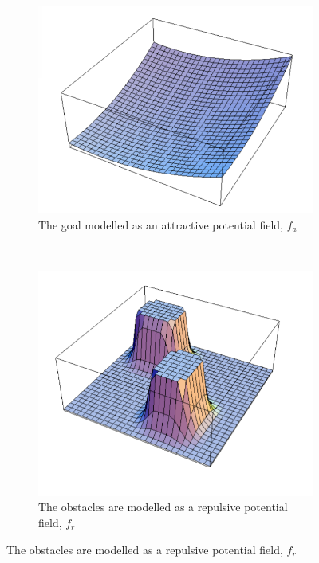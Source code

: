 \begin{figure}
    \centering
    \begin{subfigure}[b]{0.3\textwidth}
        \includegraphics[width=\textwidth]{./images/potential_goal}
		\caption{The goal modelled as an attractive potential field, $f_a$}
        \label{fig:potential_goal}
    \end{subfigure}
    ~\begin{subfigure}[b]{0.3\textwidth}
        \includegraphics[width=\textwidth]{./images/potential_obs}
		\caption{The obstacles are modelled as a repulsive potential field, $f_r$}

\end{subfigure}
\end{figure}
